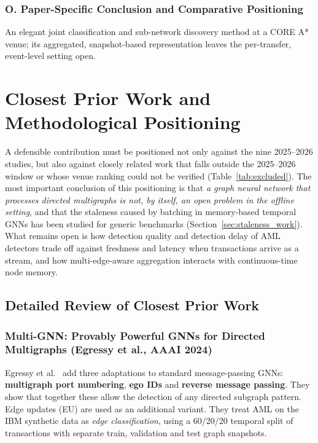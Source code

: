\documentclass[11pt,a4paper]{article}
\begin{document}
\subsubsection*{O. Paper-Specific Conclusion and Comparative Positioning}
An elegant joint classification and sub-network discovery method at a CORE A* venue; its aggregated, snapshot-based representation leaves the per-transfer, event-level setting open.

\section{Closest Prior Work and Methodological Positioning}
\label{sec:prior_work}

A defensible contribution must be positioned not only against the nine 2025--2026 studies, but also against closely related work that falls outside the 2025--2026 window or whose venue ranking could not be verified (Table~\ref{tab:excluded}). The most important conclusion of this positioning is that \emph{a graph neural network that processes directed multigraphs is not, by itself, an open problem in the offline setting}, and that the staleness caused by batching in memory-based temporal GNNs has been studied for generic benchmarks (Section~\ref{sec:staleness_work}). What remains open is how detection quality and detection delay of AML detectors trade off against freshness and latency when transactions arrive as a stream, and how multi-edge-aware aggregation interacts with continuous-time node memory.

\subsection{Detailed Review of Closest Prior Work}

\subsubsection{Multi-GNN: Provably Powerful GNNs for Directed Multigraphs (Egressy et al., AAAI 2024)}
Egressy et al.\ \cite{egressy2024multigraph} add three adaptations to standard message-passing GNNs: \textbf{multigraph port numbering}, \textbf{ego IDs} and \textbf{reverse message passing}. They show that together these allow the detection of any directed subgraph pattern. Edge updates (EU) are used as an additional variant. They treat AML on the IBM synthetic data \cite{altman2023ibmaml} as \emph{edge classification}, using a 60/20/20 temporal split of transactions with separate train, validation and test graph snapshots.
\end{document}
